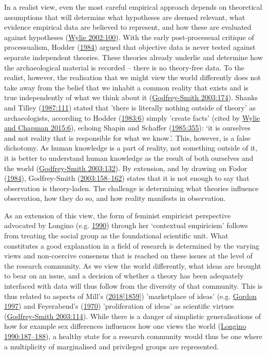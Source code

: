 \documentclass[
  12pt,
  a4paper,
  oneside]{book}
\begin{document}
In a realist view, even the most careful empirical approach depends on theoretical assumptions that will determine what hypotheses are deemed relevant, what evidence empirical data are believed to represent, and how these are evaluated against hypotheses (\protect\hyperlink{ref-wylie2002}{Wylie 2002:100}). With the early post-processual critique of processualism, Hodder (\protect\hyperlink{ref-hodder1984}{1984}) argued that objective data is never tested against separate independent theories. These theories already underlie and determine how the archaeological material is recorded -- there is no theory-free data. To the realist, however, the realisation that we might view the world differently does not take away from the belief that we inhabit a common reality that exists and is true independently of what we think about it (\protect\hyperlink{ref-godfrey-smith2003}{Godfrey-Smith 2003:174}). Shanks and Tilley (\protect\hyperlink{ref-shanks1987}{1987:111}) stated that 'there is literally nothing outside of theory' as archaeologists, according to Hodder (\protect\hyperlink{ref-hodder1983}{1983:6}) simply 'create facts' (cited by \protect\hyperlink{ref-wylie2015}{Wylie and Chapman 2015:6}), echoing Shapin and Schaffer (\protect\hyperlink{ref-shapin1985}{1985:355}): `it is ourselves and not reality that is responsible for what we know.'. This, however, is a false dichotomy. As human knowledge is a part of reality, not something outside of it, it is better to understand human knowledge as the result of both ourselves and the world (\protect\hyperlink{ref-godfrey-smith2003}{Godfrey-Smith 2003:132}). By extension, and by drawing on Fodor (\protect\hyperlink{ref-fodor1984}{1984}), Godfrey-Smith (\protect\hyperlink{ref-godfrey-smith2003}{2003:158--162}) states that it is not enough to say that observation is theory-laden. The challenge is determining what theories influence observation, how they do so, and how reality manifests in observation.

As an extension of this view, the form of feminist empiricist perspective advocated by Longino (e.g. \protect\hyperlink{ref-longino1990}{1990}) through her `contextual empiricism' follows from treating the social group as the foundational scientific unit. What constitutes a good explanation in a field of research is determined by the varying views and non-coercive consensus that is reached on these issues at the level of the research community. As we view the world differently, what ideas are brought to bear on an issue, and a decision of whether a theory has been adequately interfaced with data will thus follow from the diversity of that community. This is thus related to aspects of Mill's (\protect\hyperlink{ref-mill1859}{2018{[}1859{]}}) 'marketplace of ideas' (e.g. \protect\hyperlink{ref-gordon1997}{Gordon 1997}) and Feyerabend's (\protect\hyperlink{ref-feyerabend1970}{1970}) 'proliferation of ideas' as scientific virtues (\protect\hyperlink{ref-godfrey-smith2003}{Godfrey-Smith 2003:114}). While there is a danger of simplistic generalisations of how for example sex differences influences how one views the world (\protect\hyperlink{ref-longino1990}{Longino 1990:187--188}), a healthy state for a research community would thus be one where a multiplicity of marginalised and privileged groups are represented.
\end{document}
